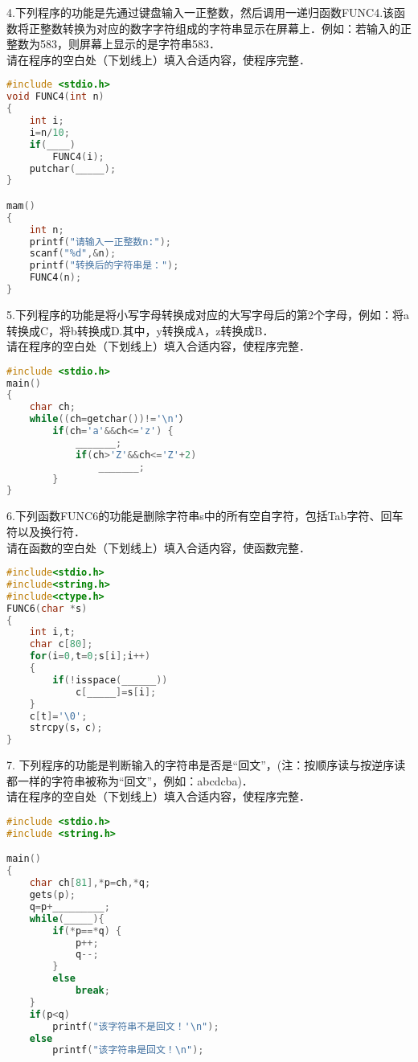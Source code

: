 4.下列程序的功能是先通过键盘输入一正整数，然后调用一递归函数FUNC4.该函数将正整数转换为对应的数字字符组成的字符串显示在屏幕上．例如：若输入的正整数为583，则屏幕上显示的是字符串583． \\
请在程序的空白处（下划线上）填入合适内容，使程序完整．
\begin{lstlisting}[language=cpp]
#include <stdio.h>
void FUNC4(int n)
{
    int i;
    i=n/10;
    if(____)
        FUNC4(i);
    putchar(_____);
}

mam()
{
    int n;
    printf("请输入一正整数n:");
    scanf("%d",&n);
    printf("转换后的字符串是：");
    FUNC4(n);
}
\end{lstlisting}

5.下列程序的功能是将小写字母转换成对应的大写字母后的第2个字母，例如：将a转换成C，将b转换成D.其中，y转换成A，z转换成B． \\
请在程序的空白处（下划线上）填入合适内容，使程序完整．
\begin{lstlisting}[language=cpp]
#include <stdio.h>
main()
{
    char ch;
    while((ch=getchar())!='\n'）
        if(ch='a'&&ch<='z') {
            _______;
            if(ch>'Z'&&ch<='Z'+2)
                _______;
        }
}
\end{lstlisting}
    
6.下列函数FUNC6的功能是删除字符串s中的所有空自字符，包括Tab字符、回车符以及换行符． \\
请在函数的空白处（下划线上）填入合适内容，使函数完整．
\begin{lstlisting}[language=cpp]
#include<stdio.h>
#include<string.h>
#include<ctype.h>
FUNC6(char *s)
{
    int i,t;
    char c[80];
    for(i=0,t=0;s[i];i++)
    {
        if(!isspace(______))
            c[_____]=s[i];
    }
    c[t]='\0';
    strcpy(s，c);
}
\end{lstlisting}

7. 下列程序的功能是判断输入的字符串是否是“回文”，(注：按顺序读与按逆序读都一样的字符串被称为“回文”，例如：abcdcba)． \\
请在程序的空自处（下划线上）填入合适内容，使程序完整．
\begin{lstlisting}[language=cpp]
#include <stdio.h>
#include <string.h>

main()
{
    char ch[81],*p=ch,*q;
    gets(p);
    q=p+_________;
    while(_____){
        if(*p==*q) {
            p++;
            q--;
        }
        else
            break;
    }
    if(p<q)
        printf("该字符串不是回文！'\n");
    else
        printf("该字符串是回文！\n");
\end{lstlisting}

